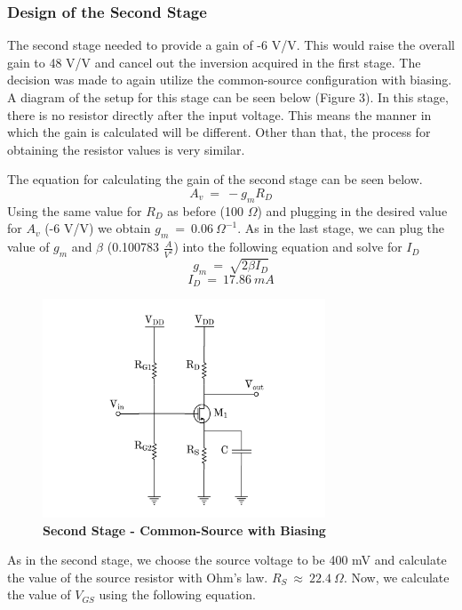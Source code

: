 \documentclass{article}
\begin{document}
    \subsubsection{Design of the Second Stage}
    \par
    \quad \quad The second stage needed to provide a gain of -6 V/V. This would raise the overall gain to 48 V/V and cancel out the inversion acquired in the first stage. The decision was made to again utilize the common-source configuration with biasing. A diagram of the setup for this stage can be seen below (Figure 3). In this stage, there is no resistor directly after the input voltage. This means the manner in which the gain is calculated will be different. Other than that, the process for obtaining the resistor values is very similar.  \\
    \par
    The equation for calculating the gain of the second stage can be seen below. \\
    $$ A_v\ =\ -g_mR_D $$
    Using the same value for $R_D$ as before (100 $\Omega$) and plugging in the desired value for $A_v$ (-6 V/V) we obtain $g_m\ =\ 0.06\ \Omega^{-1}$. As in the last stage, we can plug the value of $g_m$ and $\beta$ (0.100783 $\frac{A}{V^2}$) into the following equation and solve for $I_D$
    $$ g_m\ =\ \sqrt{2\beta I_D} $$
    $$ I_D\ =\ 17.86\ mA$$
    \begin{figure}[H]
        \caption{\textbf{Second Stage - Common-Source with Biasing}}
    	\centerline{\includegraphics[width=0.75\textwidth]{second_stage}}
    \end{figure}
    As in the second stage, we choose the source voltage to be 400 mV and calculate the value of the source resistor with Ohm's law. $R_S\ \approx\ 22.4\ \Omega$. Now, we calculate the value of $V_{GS}$ using the following equation.
\end{document}
